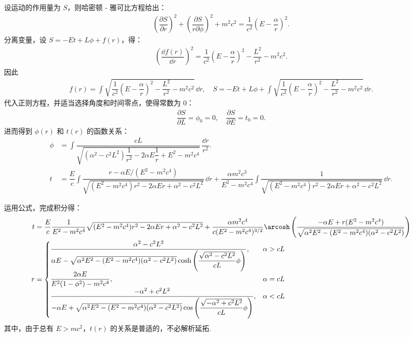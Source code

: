 设运动的作用量为 \(S\)，则哈密顿 - 雅可比方程给出：
\begin{align*}
	\left( \dfrac{\partial S}{\partial r} \right)^2 + \left( \dfrac{\partial S}{r \partial \phi} \right)^2 + m^2 c^2 = \dfrac{1}{c^2} \left( E - \dfrac{\alpha}{r} \right)^2.
\end{align*}
分离变量，设 \(S = -Et + L\phi + f(r)\)，得：
\begin{align*}
	\left( \dfrac{\dd f(r)}{\dd r} \right)^2 = \dfrac{1}{c^2} \left( E - \dfrac{\alpha}{r} \right)^2 - \dfrac{L^2}{r^2} - m^2 c^2.
\end{align*}
因此
\begin{align*}
	f(r) = \int \sqrt{\dfrac{1}{c^2} \left( E - \dfrac{\alpha}{r} \right)^2 - \dfrac{L^2}{r^2} - m^2 c^2} \, \dd r,\quad
	S = -Et + L\phi + \int \sqrt{\dfrac{1}{c^2} \left( E - \dfrac{\alpha}{r} \right)^2 - \dfrac{L^2}{r^2} - m^2 c^2} \, \dd r.
\end{align*}
代入正则方程，并适当选择角度和时间零点，使得常数为 0：
\begin{align*}
	\dfrac{\partial S}{\partial L} = \phi_0 = 0, \quad \dfrac{\partial S}{\partial E} = t_0 = 0.
\end{align*}
进而得到 \(\phi(r)\) 和 \(t(r)\) 的函数关系：
\begin{align*}
	\phi &= \int \dfrac{cL}{\sqrt{(\alpha^2 - c^2 L^2) \dfrac{1}{r^2} - 2 \alpha E \dfrac{1}{r} + E^2 - m^2 c^4}} \, \dfrac{\dd r}{r^2}.\\
	t &= \dfrac{E}{c} \int \dfrac{r - \alpha E / (E^2 - m^2 c^4)}{\sqrt{(E^2 - m^2 c^4) r^2 - 2 \alpha E r + \alpha^2 - c^2 L^2}} \, \dd r + \dfrac{\alpha m^2 c^3}{E^2 - m^2 c^4} \int \dfrac{1}{\sqrt{(E^2 - m^2 c^4) r^2 - 2 \alpha E r + \alpha^2 - c^2 L^2}} \, \dd r.
\end{align*}

运用公式，完成积分得：
\begin{equation*}
	\begin{split}
			t & = \dfrac{E}{c} \dfrac{1}{E^2 - m^2 c^4} \sqrt{(E^2 - m^2 c^4) r^2 - 2 \alpha E r + \alpha^2 - c^2 L^2} + \dfrac{\alpha m^2 c^4}{c (E^2 - m^2 c^4)^{3/2}} \arcosh \left( \dfrac{-\alpha E + r (E^2 - m^2 c^4)}{\sqrt{\alpha^2 E^2 - (E^2 - m^2 c^4) (\alpha^2 - c^2 L^2)}} \right) \\
			r & =
			\begin{cases}
				\dfrac{\alpha^2 - c^2 L^2}{\alpha E - \sqrt{\alpha^2 E^2 - (E^2 - m^2 c^4) (\alpha^2 - c^2 L^2)} \cosh \left( \dfrac{\sqrt{\alpha^2 - c^2 L^2}}{c L} \phi \right)},   & \alpha > c L \\
				\dfrac{2 \alpha E}{E^2 (1 - \phi^2) - m^2 c^4},                                                                                                                       & \alpha = c L \\
				\dfrac{-\alpha^2 + c^2 L^2}{-\alpha E + \sqrt{\alpha^2 E^2 - (E^2 - m^2 c^4) (\alpha^2 - c^2 L^2)} \cos \left( \dfrac{\sqrt{-\alpha^2 + c^2 L^2}}{c L} \phi \right)}, & \alpha < c L
			\end{cases}
		\end{split}
\end{equation*}
其中，由于总有 \(E > mc^2\)，\(t(r)\) 的关系是普适的，不必解析延拓.

